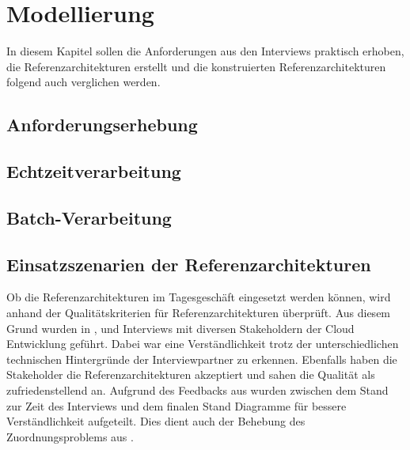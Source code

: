 \chapter{Modellierung}\label{chapter:Modellierun}
In diesem Kapitel sollen die Anforderungen aus den Interviews praktisch erhoben, die Referenzarchitekturen erstellt und die konstruierten Referenzarchitekturen folgend auch verglichen werden.
\section{Anforderungserhebung}\label{section:Anforderungserhebun}


\section{Echtzeitverarbeitung}\label{chap:ra-rt}


\section{Batch-Verarbeitung}\label{chap:ra-batch}


\section{Einsatzszenarien der Referenzarchitekturen}\label{section:Einsatzszenarien-der-Referenzarchitekture}
Ob die Referenzarchitekturen im Tagesgeschäft eingesetzt werden können, wird anhand der Qualitätskriterien für Referenzarchitekturen überprüft. Aus diesem Grund wurden in  ,  und  Interviews mit diversen Stakeholdern der Cloud Entwicklung geführt. Dabei war eine Verständlichkeit trotz der unterschiedlichen technischen Hintergründe der Interviewpartner zu erkennen. Ebenfalls haben die Stakeholder die Referenzarchitekturen akzeptiert und sahen die Qualität als zufriedenstellend an. Aufgrund des Feedbacks aus  wurden zwischen dem Stand zur Zeit des Interviews und dem finalen Stand Diagramme für bessere Verständlichkeit aufgeteilt. Dies dient auch der Behebung des Zuordnungsproblems aus .

